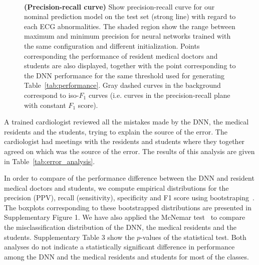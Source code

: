 \documentclass{article}
\begin{document}
\begin{figure*}[h]
    \centering
    \\
    \caption{\textbf{(Precision-recall curve)} Show precision-recall curve for our nominal prediction model on the test set (strong line) with regard to each ECG abnormalities. The shaded region show the range between maximum and minimum precision for neural networks trained with the same configuration and different initialization. Points corresponding the performance of resident medical doctors and students are also displayed, together with the point corresponding to the DNN performance for the same threshold used for generating Table~\ref{tab:performance}. Gray dashed curves in the background correspond to iso-$F_1$ curves (i.e. curves in the precision-recall plane with constant $F_1$ score).}
    \label{fig:precision_recall}
\end{figure*}


A trained cardiologist reviewed all the mistakes made by the DNN, the medical residents and the students, trying to explain the source of the error. The cardiologist had meetings with the residents and students where they together agreed on which was the source of the error. The results of this analysis are given in Table~\ref{tab:error_analysis}.

In order to compare of the performance difference between the DNN and resident medical doctors and students, we compute empirical distributions for the precision (PPV), recall (sensitivity), specificity and F1 score using bootstraping~\cite{efron_introduction_1994}.  The boxplots corresponding to these bootstrapped distributions are presented in Supplementary Figure 1. We have also applied the McNemar test~\cite{mcnemar_note_1947} to compare the misclassification distribution of the DNN, the medical residents and the students. Supplementary Table 3 show the $p$-values of the statistical test. Both analyses do not indicate a statistically significant difference in performance among the DNN and the medical residents and students for most of the classes. 
\end{document}
